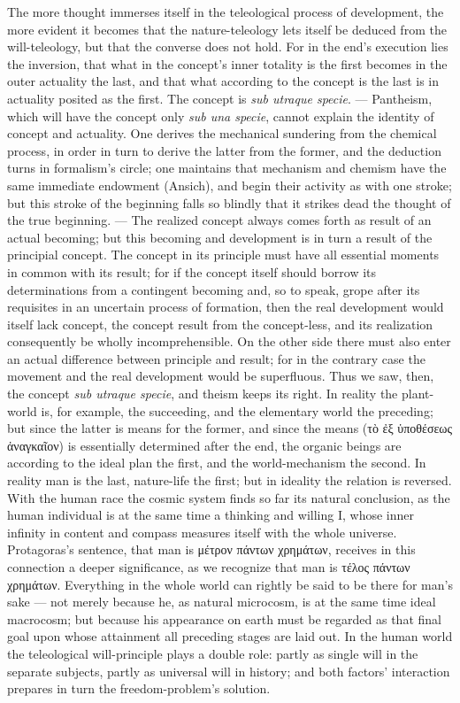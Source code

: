 \documentclass[12pt]{book}
\begin{document}
The more thought immerses itself in the teleological process of development,
the more evident it becomes that the nature-teleology lets itself be deduced
from the will-teleology, but that the converse does not hold. For in the
end's execution lies the inversion, that what in the concept's inner
totality is the first becomes in the outer actuality the last, and that what
according to the concept is the last is in actuality posited as the first.
The concept is \textit{sub utraque specie}. --- Pantheism, which will have
the concept only \textit{sub una specie}, cannot explain the identity of
concept and actuality. One derives the mechanical sundering from the
chemical process, in order in turn to derive the latter from the former, and
the deduction turns in formalism's circle; one maintains that mechanism and
chemism have the same immediate endowment (Ansich), and begin their activity
as with one stroke; but this stroke of the beginning falls so blindly that
it strikes dead the thought of the true beginning. --- The realized concept
always comes forth as result of an actual becoming; but this becoming and
development is in turn a result of the principial concept. The concept in
its principle must have all essential moments in common with its result; for
if the concept itself should borrow its determinations from a contingent
becoming and, so to speak, grope after its requisites in an uncertain
process of formation, then the real development would itself lack concept,
the concept result from the concept-less, and its realization consequently
be wholly incomprehensible. On the other side there must also enter an
actual difference between principle and result; for in the contrary case the
movement and the real development would be superfluous. Thus we saw, then,
the concept \textit{sub utraque specie}, and theism keeps its right. In
reality the plant-world is, for example, the succeeding, and the elementary
world the preceding; but since the latter is means for the former, and since
the means (τὸ ἐξ ὑποθέσεως ἀναγκαῖον) is essentially determined after the
end, the organic beings are according to the ideal plan the first, and the
world-mechanism the second. In reality man is the last, nature-life the
first; but in ideality the relation is reversed. With the human race the
cosmic system finds so far its natural conclusion, as the human individual
is at the same time a thinking and willing I, whose inner infinity in
content and compass measures itself with the whole universe. Protagoras's
sentence, that man is μέτρον πάντων χρημάτων, receives in this connection a
deeper significance, as we recognize that man is τέλος πάντων χρημάτων.
Everything in the whole world can rightly be said to be there for man's sake
--- not merely because he, as natural microcosm, is at the same time ideal
macrocosm; but because his appearance on earth must be regarded as that
final goal upon whose attainment all preceding stages are laid out. In the
human world the teleological will-principle plays a double role: partly as
single will in the separate subjects, partly as universal will in history;
and both factors' interaction prepares in turn the freedom-problem's
solution.
\end{document}
